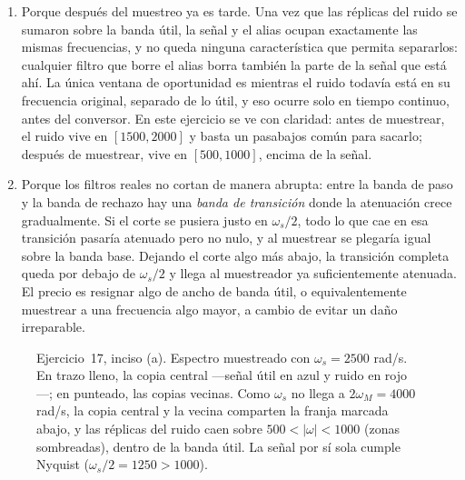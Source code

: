 \documentclass[10pt,a4paper]{article}
\begin{document}
\begin{enumerate}
		Por eso, en una cadena de adquisición concreta el filtro antialiasing es obligatorio,
		porque es lo único que acota el espectro que llega al muestreador. La elección de $\omega_s$ pasa a ser complementaria. Aumentarla le deja al
		filtro una banda de transición más ancha, y con eso el filtro puede ser de menor orden,
		pero no lo reemplaza.

		\item Porque después del
		muestreo ya es tarde. Una vez que las réplicas del ruido se sumaron sobre la banda
		útil, la señal y el alias ocupan exactamente las mismas frecuencias, y no queda ninguna
		característica que permita separarlos: cualquier filtro que borre el alias borra
		también la parte de la señal que está ahí. La única ventana de oportunidad es mientras
		el ruido todavía está en su frecuencia original, separado de lo útil, y eso ocurre solo
		en tiempo continuo, antes del conversor. En este ejercicio se ve con claridad: antes de
		muestrear, el ruido vive en $[1500,2000]$ y basta un pasabajos común para sacarlo;
		después de muestrear, vive en $[500,1000]$, encima de la señal.

		\item Porque
		los filtros reales no cortan de manera abrupta: entre la banda de paso y la banda de
		rechazo hay una \emph{banda de transición} donde la atenuación crece gradualmente. Si el
		corte se pusiera justo en $\omega_s/2$, todo lo que cae en esa transición pasaría
		atenuado pero no nulo, y al muestrear se plegaría igual sobre la banda base. Dejando el
		corte algo más abajo, la transición completa queda por debajo de $\omega_s/2$ y llega
		al muestreador ya suficientemente atenuada. El precio es resignar algo de ancho de
		banda útil, o equivalentemente muestrear a una frecuencia algo mayor, a cambio de evitar
		un daño irreparable.
	\end{enumerate}

	\begin{figure}[H]
		\centering
		
		\caption{Ejercicio~17, inciso (a). Espectro muestreado con
		$\omega_s = 2500$ rad/s. En trazo lleno, la copia central ---señal útil en azul y
		ruido en rojo---; en punteado, las copias vecinas. Como $\omega_s$ no llega a
		$2\omega_M = 4000$ rad/s, la copia central y la vecina comparten la franja marcada
		abajo, y las réplicas del ruido caen sobre $500 < |\omega| < 1000$ (zonas
		sombreadas), dentro de la banda útil. La señal por sí sola cumple Nyquist
		($\omega_s/2 = 1250 > 1000$).}
		\label{fig:sol_ej17}
	\end{figure}
\end{document}
